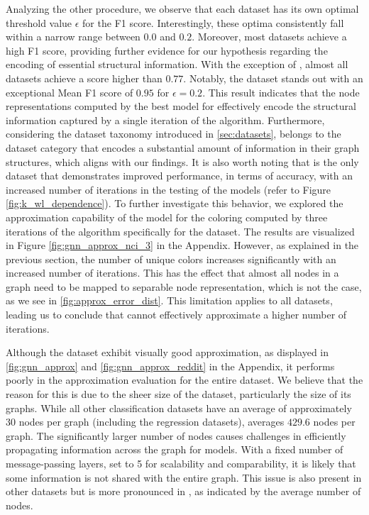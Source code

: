 Analyzing the other procedure, we observe that each dataset has its own optimal threshold value $\epsilon$ for the F1 score. Interestingly, these optima consistently fall within a narrow range between $0.0$ and $0.2$. Moreover, most datasets achieve a high F1 score, providing further evidence for our hypothesis regarding the encoding of essential structural information. With the exception of \reddit, almost all datasets achieve a score higher than $0.77$. Notably, the \nci dataset stands out with an exceptional Mean F1 score of $0.95$ for $\epsilon = 0.2$. This result indicates that the node representations computed by the best \gnn model for \nci effectively encode the structural information captured by a single iteration of the \wl algorithm. Furthermore, considering the dataset taxonomy introduced in \cref{sec:datasets}, \nci belongs to the dataset category that encodes a substantial amount of information in their graph structures, which aligns with our findings.
It is also worth noting that \nci is the only dataset that demonstrates improved performance, in terms of accuracy, with an increased number of \wl iterations in the testing of the \wlnn models (refer to Figure \ref{fig:k_wl_dependence}). To further investigate this behavior, we explored the approximation capability of the \gnn model for the coloring computed by three iterations of the \wl algorithm specifically for the \nci dataset. The results are visualized in Figure \ref{fig:gnn_approx_nci_3} in the Appendix. However, as explained in the previous section, the number of unique colors increases significantly with an increased number of \wl iterations. This has the effect that almost all nodes in a graph need to be mapped to separable node representation, which is not the case, as we see in \cref{fig:approx_error_dist}. This limitation applies to all datasets, leading us to conclude that \gnns cannot effectively approximate a higher number of \wl iterations.

Although the \reddit dataset exhibit visually good approximation, as displayed in \cref{fig:gnn_approx} and \cref{fig:gnn_approx_reddit} in the Appendix, it performs poorly in the approximation evaluation for the entire dataset. We believe that the reason for this is due to the sheer size of the dataset, particularly the size of its graphs. While all other classification datasets have an average of approximately $30$ nodes per graph (including the regression datasets), \reddit averages $429.6$ nodes per graph. The significantly larger number of nodes causes challenges in efficiently propagating information across the graph for \gnn models. With a fixed number of message-passing layers, set to 5 for scalability and comparability, it is likely that some information is not shared with the entire graph. This issue is also present in other datasets but is more pronounced in \reddit, as indicated by the average number of nodes. \todo{!}

